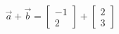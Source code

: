 \documentclass[preview]{standalone}
\begin{document}
\begin{align*}
\vec{a} + \vec{b} = \begin{bmatrix} -1 \\ 2 \end{bmatrix} + \begin{bmatrix} 2 \\ 3 \end{bmatrix}
\end{align*}
\end{document}
